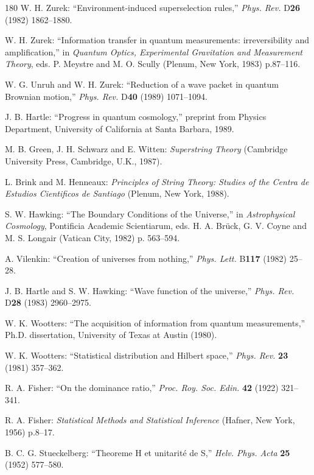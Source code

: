 \documentclass[11pt]{article}
\begin{document}
\begin{thebibliography}{180}
		W. H. Zurek: ``Environment-induced superselection rules,'' \emph{Phys. Rev.} D\textbf{26} (1982) 1862--1880.
		
		W. H. Zurek: ``Information transfer in quantum measurements: irreversibility and amplification,'' in \emph{Quantum Optics, Experimental Gravitation and Measurement Theory}, eds. P. Meystre and M. O. Scully (Plenum, New York, 1983) p.87--116.
		
		W. G. Unruh and W. H. Zurek: ``Reduction of a wave packet in quantum Brownian motion,'' \emph{Phys. Rev.} D\textbf{40} (1989) 1071--1094.
		
		J. B. Hartle: ``Progress in quantum cosmology,'' preprint from Physics Department, University of California at Santa Barbara, 1989.
		
		M. B. Green, J. H. Schwarz and E. Witten: \emph{Superstring Theory} (Cambridge University Press, Cambridge, U.K., 1987).
		
		L. Brink and M. Henneaux: \emph{Principles of String Theory: Studies of the Centra de Estudios Cientificos de Santiago} (Plenum, New York, 1988).
		
		S. W. Hawking: ``The Boundary Conditions of the Universe,'' in \emph{Astrophysical Cosmology}, Pontificia Academic Scientiarum, eds. H. A. Brück, G. V. Coyne and M. S. Longair (Vatican City, 1982) p. 563--594.
		
		A. Vilenkin: ``Creation of universes from nothing,'' \emph{Phys. Lett.} B\textbf{117} (1982) 25--28.
		
		J. B. Hartle and S. W. Hawking: ``Wave function of the universe,'' \emph{Phys. Rev.} D\textbf{28} (1983) 2960--2975.
		
		W. K. Wootters: ``The acquisition of information from quantum measurements,'' Ph.D. dissertation, University of Texas at Austin (1980).
		
		W. K. Wootters: ``Statistical distribution and Hilbert space,'' \emph{Phys. Rev.} \textbf{23} (1981) 357--362.
		
		R. A. Fisher: ``On the dominance ratio,'' \emph{Proc. Roy. Soc. Edin.} \textbf{42} (1922) 321--341.
		
		R. A. Fisher: \emph{Statistical Methods and Statistical Inference} (Hafner, New York, 1956) p.8--17.
		
		B. C. G. Stueckelberg: ``Theoreme H et unitarité de S,'' \emph{Helv. Phys. Acta} \textbf{25} (1952) 577--580.
		

\end{thebibliography}
\end{document}
